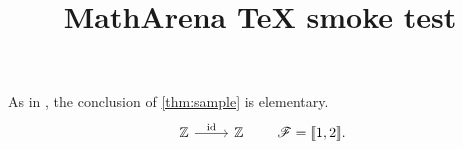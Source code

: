 \documentclass{amsart}
\begin{document}
\title{MathArena TeX smoke test}
\maketitle

As in \cite{sample}, the conclusion of \cref{thm:sample} is elementary.
\[
  \begin{tikzcd}
    \mathbb{Z} \arrow[r, "\mathrm{id}"] & \mathbb{Z}
  \end{tikzcd}
  \qquad \mathscr{F} = \llbracket 1,2 \rrbracket.
\]


\end{document}
